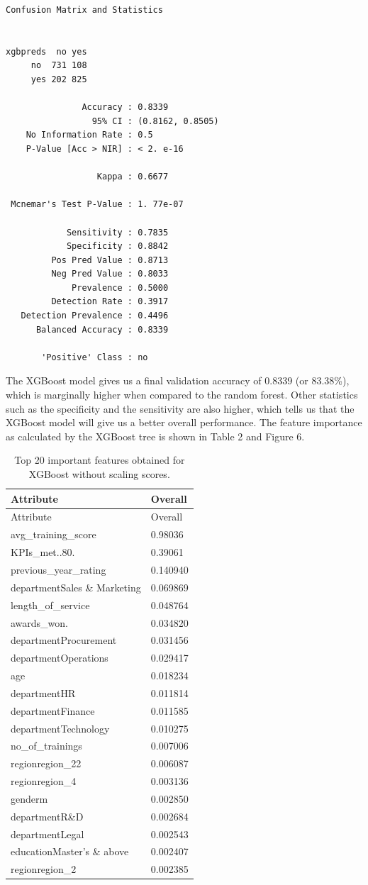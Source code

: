 \documentclass[
]{article}
\begin{document}
\begin{verbatim}
Confusion Matrix and Statistics

        
xgbpreds  no yes
     no  731 108
     yes 202 825
                                          
               Accuracy : 0.8339          
                 95% CI : (0.8162, 0.8505)
    No Information Rate : 0.5             
    P-Value [Acc > NIR] : < 2. e-16       
                                          
                  Kappa : 0.6677          
                                          
 Mcnemar's Test P-Value : 1. 77e-07       
                                          
            Sensitivity : 0.7835          
            Specificity : 0.8842          
         Pos Pred Value : 0.8713          
         Neg Pred Value : 0.8033          
             Prevalence : 0.5000          
         Detection Rate : 0.3917          
   Detection Prevalence : 0.4496          
      Balanced Accuracy : 0.8339          
                                          
       'Positive' Class : no
\end{verbatim}

The XGBoost model gives us a final validation accuracy of 0.8339 (or
83.38\%), which is marginally higher when compared to the random forest.
Other statistics such as the specificity and the sensitivity are also
higher, which tells us that the XGBoost model will give us a better
overall performance. The feature importance as calculated by the XGBoost
tree is shown in Table 2 and Figure 6.

\begin{longtable}[]{@{}ll@{}}
\caption{Top 20 important features obtained for XGBoost without scaling
scores.}\tabularnewline
\toprule
Attribute & Overall\tabularnewline
\midrule
\endfirsthead
\toprule
Attribute & Overall\tabularnewline
\midrule
\endhead
avg\_training\_score & 0.98036\tabularnewline
KPIs\_met..80. & 0.39061\tabularnewline
previous\_year\_rating & 0.140940\tabularnewline
departmentSales \& Marketing & 0.069869\tabularnewline
length\_of\_service & 0.048764\tabularnewline
awards\_won. & 0.034820\tabularnewline
departmentProcurement & 0.031456\tabularnewline
departmentOperations & 0.029417\tabularnewline
age & 0.018234\tabularnewline
departmentHR & 0.011814\tabularnewline
departmentFinance & 0.011585\tabularnewline
departmentTechnology & 0.010275\tabularnewline
no\_of\_trainings & 0.007006\tabularnewline
regionregion\_22 & 0.006087\tabularnewline
regionregion\_4 & 0.003136\tabularnewline
genderm & 0.002850\tabularnewline
departmentR\&D & 0.002684\tabularnewline
departmentLegal & 0.002543\tabularnewline
educationMaster's \& above & 0.002407\tabularnewline
regionregion\_2 & 0.002385\tabularnewline
\bottomrule
\end{longtable}
\end{document}
